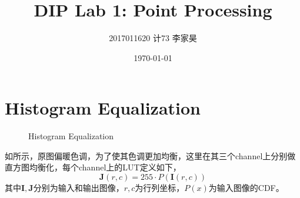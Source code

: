 \documentclass[12pt,a4paper]{article}
\title{DIP Lab 1: Point Processing}
\author{2017011620 计73 李家昊}
\date{\today}
\begin{document}

\maketitle

\section{Histogram Equalization}

\begin{figure}[H]
    \centering
    \caption{Histogram Equalization}
    \label{fig:hist_eq}
\end{figure}

如所示，原图偏暖色调，为了使其色调更加均衡，这里在其三个channel上分别做直方图均衡化，每个channel上的LUT定义如下，
\begin{equation}
    \boldsymbol{J}(r, c) = 255 \cdot P(\boldsymbol{I}(r, c))
\end{equation}
其中$\boldsymbol{I}, \boldsymbol{J}$分别为输入和输出图像，$r, c$为行列坐标，$P(x)$为输入图像的CDF。
\end{document}
